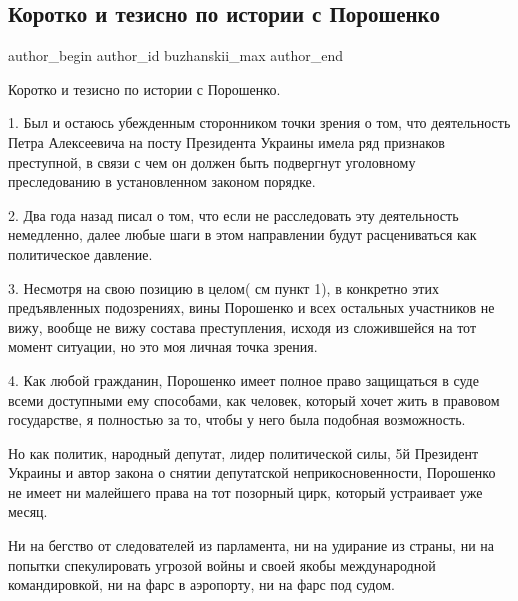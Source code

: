  
 
 
 
 
 
\subsection{Коротко и тезисно по истории с Порошенко}
\label{sec:17_01_2022.fb.buzhanskii_max.1.istoria_s_poroshenko}
 
\ifcmt
 author_begin
   author_id buzhanskii_max
 author_end
\fi

Коротко и тезисно по истории с Порошенко.

1.  Был и остаюсь убежденным сторонником точки зрения о том, что деятельность
Петра Алексеевича на посту Президента Украины имела ряд признаков преступной, в
связи с чем он должен быть подвергнут уголовному преследованию в установленном
законом порядке.

2.  Два года назад писал о том, что если не расследовать эту деятельность
немедленно, далее любые шаги в этом направлении будут расцениваться как
политическое давление.

3.  Несмотря на свою позицию в целом( см пункт 1), в конкретно этих
предъявленных подозрениях, вины Порошенко и всех остальных участников не вижу,
вообще не вижу состава преступления, исходя из сложившейся на тот момент
ситуации, но это моя личная точка зрения.

4. Как любой гражданин, Порошенко имеет полное право защищаться в суде всеми
доступными ему способами, как человек, который хочет жить в правовом
государстве, я полностью за то, чтобы у него была подобная возможность.

Но как политик, народный депутат, лидер политической силы, 5й Президент Украины
и автор закона о снятии депутатской неприкосновенности, Порошенко не имеет ни
малейшего права на тот позорный цирк, который устраивает уже месяц.

Ни на бегство от следователей из парламента, ни на удирание из страны, ни на
попытки спекулировать угрозой войны и своей якобы международной командировкой,
ни на фарс в аэропорту, ни на фарс под судом.

